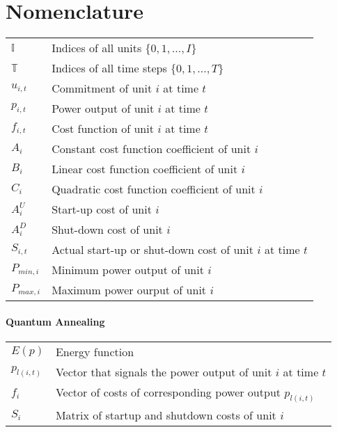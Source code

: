 \chapter*{Nomenclature}

\begin{tabular}{ll}
  $\mathbb{I}$ & Indices of all units $\{0, 1, \ldots, I\}$\\
  $\mathbb{T}$ & Indices of all time steps $\{0, 1, \ldots, T\}$ \\
  $u_{i, t}$ & Commitment of unit $i$ at time $t$ \\
  $p_{i, t}$ & Power output of unit $i$ at time $t$ \\
  $f_{i, t}$ & Cost function of unit $i$ at time $t$ \\
  $A_i$ & Constant cost function coefficient of unit $i$ \\
  $B_i$ & Linear cost function coefficient of unit $i$ \\
  $C_i$ & Quadratic cost function coefficient of unit $i$ \\
  $A^U_i$ & Start-up cost of unit $i$ \\
  $A^D_i$ & Shut-down cost of unit $i$ \\
  $S_{i, t}$ & Actual start-up or shut-down cost of unit $i$ at time $t$ \\
  $P_{min, i}$ & Minimum power output of unit $i$ \\
  $P_{max, i}$ & Maximum power ourput of unit $i$
\end{tabular}

\subsubsection{Quantum Annealing}

\begin{tabular}{ll}
  $E(p)$ & Energy function \\
  $p_{l(i, t)}$ & Vector that signals the power output of unit $i$ at time $t$ \\
  $f_{i}$ & Vector of costs of corresponding power output $p_{l(i, t)}$ \\
  $S_{i}$ & Matrix of startup and shutdown costs of unit $i$
\end{tabular}
